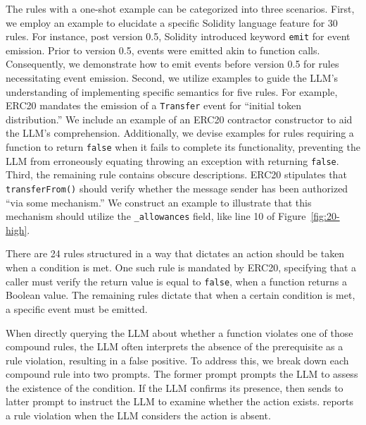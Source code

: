 The rules with a one-shot example can be categorized 
into three scenarios. First, we employ an example to elucidate a specific Solidity 
language feature for 30 rules. For instance, post version 0.5, 
Solidity introduced keyword \texttt{emit} for event emission. Prior to 
version 0.5, events were emitted akin to function calls. Consequently, we 
demonstrate how to emit events before version 0.5 
for rules necessitating event emission. %
Second, we utilize examples to guide the LLM's understanding of
implementing specific semantics for five rules. 
For example, ERC20 mandates the emission of a \texttt{Transfer} event for 
``initial token distribution.'' We include an example of an ERC20 contractor 
constructor to aid the LLM's comprehension. Additionally, we devise examples 
for rules requiring a function to return \texttt{false} when it fails to 
complete 
its functionality, preventing the LLM from erroneously equating throwing an exception with returning \texttt{false}.
Third, 
the remaining rule contains obscure descriptions. 
ERC20 stipulates that \texttt{transferFrom()} should verify whether 
the message sender 
has been authorized ``via some mechanism.'' 
We construct an example to illustrate that this mechanism should utilize the 
\texttt{\_allowances} field, like line 10 of Figure~\ref{fig:20-high}.




There are 24 rules structured in a way that dictates an action should be taken 
when a condition is met. 
One such rule is mandated by ERC20, 
specifying that a caller must verify the return value is equal to 
\texttt{false}, when a function returns a Boolean value. The remaining rules 
dictate that when a certain condition is met, 
a specific event must be emitted.

When directly querying the LLM about whether a function 
violates one of those compound rules, 
the LLM often interprets the absence of the 
prerequisite as a rule violation, resulting in a false positive. To 
address this, we break down each compound rule into two prompts.
The former prompt prompts the LLM to assess the existence of the condition. 
If the LLM confirms its presence, then \Tool{} sends to latter prompt to 
instruct the LLM to examine 
whether the action exists. \Tool{} reports a rule violation when the LLM 
considers the action is absent. 




